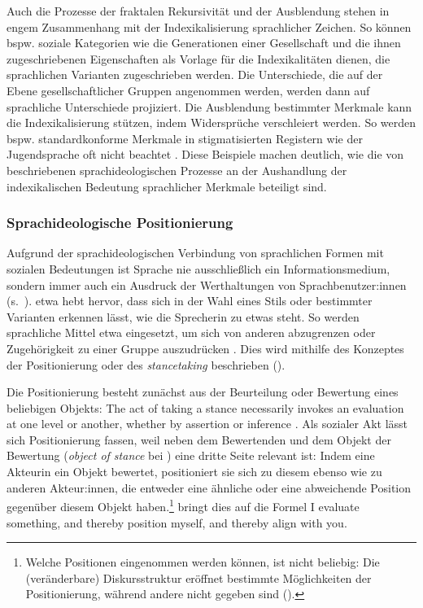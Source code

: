Auch die Prozesse der fraktalen Rekursivität und der Ausblendung stehen in engem Zusammenhang mit der Indexikalisierung sprachlicher Zeichen. 
So können bspw. soziale Kategorien wie die Generationen einer Gesellschaft und die ihnen zugeschriebenen Eigenschaften als Vorlage für die Indexikalitäten dienen, die sprachlichen Varianten zugeschrieben werden. 
Die Unterschiede, die auf der Ebene gesellschaftlicher Gruppen angenommen werden, werden dann auf sprachliche Unterschiede projiziert. 
Die Ausblendung bestimmter Merkmale kann die Indexikalisierung stützen, indem Widersprüche verschleiert werden. 
So werden bspw. standardkonforme Merkmale in stigmatisierten Registern wie der Jugendsprache oft nicht beachtet \citep[s.][143]{Hundt.2017b}. 
Diese Beispiele machen deutlich, wie die von \citet{Irvine2000} beschriebenen sprachideologischen Prozesse an der Aushandlung der indexikalischen Bedeutung sprachlicher Merkmale beteiligt sind. 
\subsubsection{Sprachideologische Positionierung}
\label{sec:Positionierung}
Aufgrund der sprachideologischen Verbindung von sprachlichen Formen mit sozialen Bedeutungen ist Sprache nie ausschließlich ein Informationsmedium, sondern immer auch ein Ausdruck der Werthaltungen von Sprachbenutzer:innen (s.~\cites[491]{HessLuttich2005}[95]{Bell.2007}[195]{Spitzmuller.2007}). 
\citet[40]{Agha2005} etwa hebt hervor, dass sich in der Wahl eines Stils oder bestimmter Varianten erkennen lässt, wie die Sprecherin zu etwas steht. 
So werden sprachliche Mittel etwa eingesetzt, um sich von anderen abzugrenzen oder Zugehörigkeit zu einer Gruppe auszudrücken \citep[s.][17]{Silverstein.1976}.
Dies wird mithilfe des Konzeptes der Positionierung oder des \textit{stancetaking} beschrieben (\cites[s.][]{DuBois.2007}{Jaffe.2016}{Spitzmuller.2017b}). 

Die Positionierung besteht zunächst aus der Beurteilung oder Bewertung eines beliebigen Objekts:
\glqq The act of taking a stance necessarily invokes an evaluation at one level or another, whether by assertion or inference\grqq{} \citep[141]{DuBois.2007}.
Als sozialer Akt lässt sich Positionierung fassen, weil neben dem Bewertenden und dem Objekt der Bewertung (\textit{object of stance} bei \citeauthor{DuBois.2007}) eine dritte Seite relevant ist:
Indem eine Akteurin ein Objekt bewertet, positioniert sie sich zu diesem ebenso wie zu anderen Akteur:innen, die entweder eine ähnliche oder eine abweichende Position gegenüber diesem Objekt haben.\footnote{Welche Positionen eingenommen werden können, ist nicht beliebig: Die (veränderbare) {Dis\-kurs\-struk\-tur} eröffnet bestimmte Möglichkeiten der Positionierung, während andere nicht gegeben sind (\cites[s.][82]{Foucault.1981}[4]{Spitzmuller.2017b}).}
\citet[163]{DuBois.2007} bringt dies auf die Formel {\glqq}I evaluate something, and thereby position myself, and thereby align with you{\grqq}.

